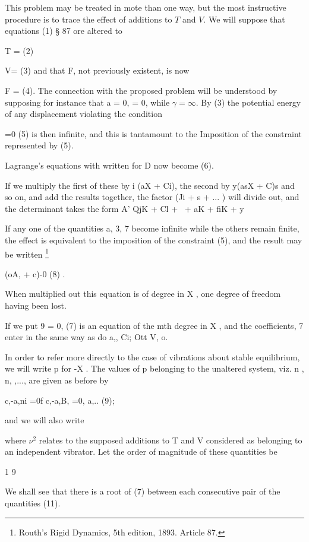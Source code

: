 This problem may be treated in mote than one way, but the most
instructive procedure is to trace the effect of additions to \(T\) and
\(V\). We will suppose that equations (1) § 87 ore altered to

T = (2)

V= (3) and that F, not previously existent, is now

F = (4).  The connection with the proposed problem will be understood
by supposing for instance that a = 0, = 0, while \( \gamma = \infty \).
By (3) the potential energy of any displacement violating the condition

=0 (5) is then infinite, and this is tantamount to the Imposition of
the constraint represented by (5).

Lagrange’s equations with  written for D now become
(6).

If we multiply the first of these by i (aX + Ci), the second by y(asX
+ C)s and so on, and add the results together, the factor
(Ji + s + ... )
will divide out, and the determinant takes the form A' QjK + Cl
+~ + aK + fiK + y~

If any one of the quantities a, 3, 7 become infinite while the others
remain finite, the effect is equivalent to the imposition of the
constraint (5), and the result may be written \footnote{Routh's Rigid
Dynamics, 5th edition, 1893. Article 87.}

 (oA, + c)-0 (8) .

When multiplied out this equation is of degree in X , one degree of
freedom having been lost.

If we put 9 = 0, (7) is an equation of the mth degree in X , and the
coefficients, 7 enter in the same way as do a,, Ci; Ott V, o.

In order to refer more directly to the case of vibrations about stable
equilibrium, we will write p for -X . The values of p belonging to the
unaltered system, viz. n , n, ,..., are given as before by

c,-a,ni =0f c,-a,B, =0, a,.. (9);

and we will also write

where \(\nu^2\) relates to the supposed additions to T and V considered
as belonging to an independent vibrator. Let the order of magnitude of
these quantities be

 1  9

We shall see that there is a root of (7) between each consecutive pair of the quantities (11).


